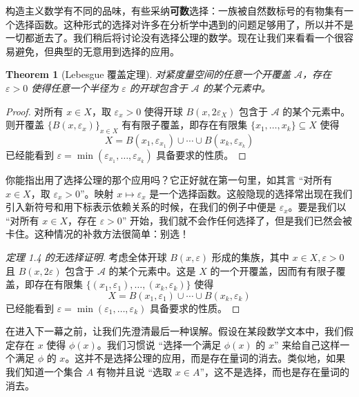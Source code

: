 \documentclass{ctexart}
\newtheorem{theorem}{Theorem}
\begin{document}
      构造主义数学有不同的品味，有些采纳\textbf{可数}选择：一族被自然数标号的有物集有一个选择函数。这种形式的选择对许多在分析学中遇到的问题足够用了，所以并不是一切都逝去了。我们稍后将讨论没有选择公理的数学。现在让我们来看看一个很容易避免，但典型的无意用到选择的应用。

      \begin{theorem}[Lebesgue 覆盖定理]
          对紧度量空间的任意一个开覆盖 \(\mathcal{A}\)，存在 \(\varepsilon > 0\) 使得任意一个半径为 \(\varepsilon\) 的开球包含于 \(\mathcal A\) 的某个元素中。
      \end{theorem}

      \begin{proof}
          对所有 \(x \in X\)，取 \(\varepsilon_x > 0\) 使得开球 \(B(x,2\varepsilon_X) \) 包含于 \(\mathcal A\) 的某个元素中。则开覆盖 \( \{B(x,\varepsilon_x)\}_{x \in X} \) 有有限子覆盖，即存在有限集 \( \{x_1, \dots, x_k\} \subseteq X \) 使得
          \[
          X = B(x_1,\varepsilon_{x_1}) \cup \cdots \cup B(x_k,\varepsilon_{x_k})
          \]
          已经能看到 \(\varepsilon = \min(\varepsilon_{x_1}, \dots, \varepsilon_{x_k})\) 具备要求的性质。
      \end{proof}

      你能指出用了选择公理的那个应用吗？它正好就在第一句里，如其言 “对所有 \(x \in X\)，取 \(\varepsilon_x > 0\)”。映射 \(x \mapsto \varepsilon_x\) 是一个选择函数。这般隐现的选择常出现在我们引入新符号和用下标表示依赖关系的时候，在我们的例子中便是 \(\varepsilon_x\)。要是我们以 “对所有 \(x \in X\)，存在 \(\varepsilon > 0\)” 开始，我们就不会作任何选择了，但是我们已然会被卡住。这种情况的补救方法很简单：别选！

      \begin{proof}[定理 1.4 的无选择证明]
          考虑全体开球 \(B(x, \varepsilon)\) 形成的集族，其中 \(x\in X, \varepsilon > 0 \) 且 \(B(x, 2\varepsilon)\) 包含于 \(\mathcal A\) 的某个元素中。这是 \(X\) 的一个开覆盖，因而有有限子覆盖，即存在有限集 \( \{(x_1, \varepsilon_1), \dots, (x_k, \varepsilon_k)\} \) 使得
          \[
          X = B(x_1,\varepsilon_1) \cup \cdots \cup B(x_k,\varepsilon_k)
          \]
          已经能看到 \(\varepsilon = \min(\varepsilon_1, \dots, \varepsilon_k)\) 具备要求的性质。
      \end{proof}

      在进入下一幕之前，让我们先澄清最后一种误解。假设在某段数学文本中，我们假定存在 \(x\) 使得 \(\phi(x)\)。我们习惯说 “选择一个满足 \(\phi(x)\) 的 \(x\)” 来给自己这样一个满足 \(\phi\) 的 \(x\)。这并不是选择公理的应用，而是存在量词的消去。类似地，如果我们知道一个集合 \(A\) 有物并且说 “选取 \(x\in A\)”，这不是选择，而也是存在量词的消去。
\end{document}
